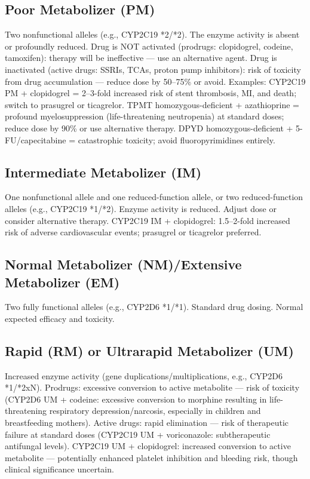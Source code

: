 \subsection*{Poor Metabolizer (PM)}
Two nonfunctional alleles (e.g., CYP2C19 *2/*2). The enzyme activity is absent or profoundly reduced. Drug is NOT activated (prodrugs: clopidogrel, codeine, tamoxifen): therapy will be ineffective --- use an alternative agent. Drug is inactivated (active drugs: SSRIs, TCAs, proton pump inhibitors): risk of toxicity from drug accumulation --- reduce dose by 50--75\% or avoid. Examples: CYP2C19 PM + clopidogrel = 2--3-fold increased risk of stent thrombosis, MI, and death; switch to prasugrel or ticagrelor. TPMT homozygous-deficient + azathioprine = profound myelosuppression (life-threatening neutropenia) at standard doses; reduce dose by 90\% or use alternative therapy. DPYD homozygous-deficient + 5-FU/capecitabine = catastrophic toxicity; avoid fluoropyrimidines entirely.

\subsection*{Intermediate Metabolizer (IM)}
One nonfunctional allele and one reduced-function allele, or two reduced-function alleles (e.g., CYP2C19 *1/*2). Enzyme activity is reduced. Adjust dose or consider alternative therapy. CYP2C19 IM + clopidogrel: 1.5--2-fold increased risk of adverse cardiovascular events; prasugrel or ticagrelor preferred.

\subsection*{Normal Metabolizer (NM)/Extensive Metabolizer (EM)}
Two fully functional alleles (e.g., CYP2D6 *1/*1). Standard drug dosing. Normal expected efficacy and toxicity.

\subsection*{Rapid (RM) or Ultrarapid Metabolizer (UM)}
Increased enzyme activity (gene duplications/multiplications, e.g., CYP2D6 *1/*2xN). Prodrugs: excessive conversion to active metabolite --- risk of toxicity (CYP2D6 UM + codeine: excessive conversion to morphine resulting in life-threatening respiratory depression/narcosis, especially in children and breastfeeding mothers). Active drugs: rapid elimination --- risk of therapeutic failure at standard doses (CYP2C19 UM + voriconazole: subtherapeutic antifungal levels). CYP2C19 UM + clopidogrel: increased conversion to active metabolite --- potentially enhanced platelet inhibition and bleeding risk, though clinical significance uncertain.

